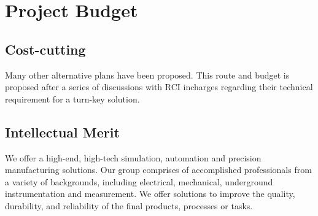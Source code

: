 \documentclass{FR16}
\begin{document}
\section{Project Budget}
 \subsection{Cost-cutting}
Many other alternative plans have been proposed. This route and budget is proposed after a series of discussions with RCI incharges regarding their technical requirement for a turn-key solution.

\subsection{Intellectual Merit}
We offer a high-end, high-tech simulation, automation and precision  manufacturing solutions. Our group comprises of accomplished professionals from a variety of backgrounds, including electrical, mechanical,  underground instrumentation and measurement. We offer solutions to improve the quality, durability, and reliability of the final products, processes or tasks. 

\newpage
\end{document}
